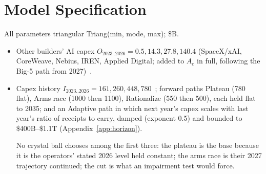 \documentclass[11pt,letterpaper]{article}
\begin{document}
\section{Model Specification}
All parameters triangular Triang(min, mode, max); \$B.
\begin{itemize}
    \item Other builders' AI capex $O_{2023..2026}=0.5, 14.3, 27.8, 140.4$ (SpaceX/xAI, CoreWeave, Nebius, IREN, Applied Digital; added to $A_c$ in full, following the Big-5 path from 2027)~\cite{ref:tc_spacex_s1,ref:crwv_q2_2026,ref:nebius_2026}.\item Capex history $I_{2023..2026}=161, 260, 448, 780$~\cite{ref:epoch_capex,ref:mlq2026}; forward paths Plateau (780 flat), Arms race (1000 then 1100), Rationalize (550 then 500), each held flat to 2035; and an Adaptive path in which next year's capex scales with last year's ratio of receipts to carry, damped (exponent 0.5) and bounded to \$400B--\$1.1T (Appendix~\ref{app:horizon}).

    No crystal ball chooses among the first three: the plateau is the base because it is the operators' stated 2026 level held constant; the arms race is their 2027 trajectory continued; the cut is what an impairment test would force.


\end{itemize}
\end{document}
